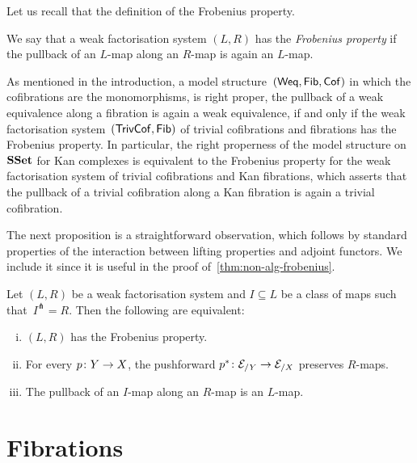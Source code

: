 \documentclass[reqno,10pt,a4paper,oneside,draft]{amsart}
\begin{document}
Let us recall that the definition of the Frobenius property.
  
  \begin{definition} We say that a weak factorisation system $(L, R)$ has the \emph{Frobenius property} if the pullback of an $L$-map along  an $R$-map is again an $L$-map. 
  \end{definition} 
  
  As mentioned in the introduction, a model structure~$(\mathsf{Weq}, \mathsf{Fib}, \mathsf{Cof})$ in which the cofibrations are the monomorphisms,
is right proper, \ie the pullback of a weak equivalence along a fibration is again a weak equivalence, 
if and only if the weak factorisation system~$(\mathsf{TrivCof}, \mathsf{Fib})$ of trivial cofibrations and fibrations has the Frobenius property. In particular, the right properness of the model structure on $\mathbf{SSet}$ for Kan complexes is equivalent to the Frobenius property
for the weak factorisation system of trivial cofibrations and Kan fibrations, which asserts 
that the pullback of a trivial cofibration along a Kan fibration
is again a trivial cofibration. 

The next proposition is a straightforward observation, which follows by standard
properties of the interaction between lifting properties and adjoint functors. We include it since it is useful
in the proof of~\cref{thm:non-alg-frobenius}.



\begin{proposition} 
\label{thm:frobenius-equivalence}
Let $(L, R)$ be a weak factorisation system and $I \subseteq L$ be a class of maps such that~$I^\pitchfork = R$. Then the following are equivalent:
\begin{enumerate}[(i)] 
\item $(L,R)$ has the Frobenius property. 
\item For every $p \colon Y \to X$, the pushforward $p^* \colon \mathcal{E}_{/Y} \to \mathcal{E}_{/X}$ preserves $R$-maps.
\item The pullback of an $I$-map along 
an $R$-map is an $L$-map.
\end{enumerate}
\end{proposition} 



\section{Fibrations} 
\end{document}
